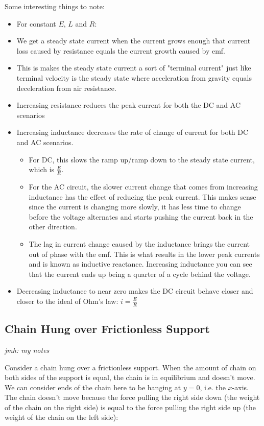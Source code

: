 \documentclass{article}
\begin{document}
Some interesting things to note:

\begin{itemize}
\item For constant $E$, $L$ and $R$:
\item We get a steady state current when the current grows enough that current loss caused by resistance equals the current growth caused by emf.
\item This is makes the steady state current a sort of "terminal current" just like terminal velocity is the steady state where acceleration from gravity equals deceleration from air resistance.
\item Increasing resistance reduces the peak current for both the DC and AC scenarios
\item Increasing inductance decreases the rate of change of current for both DC and AC scenarios.
\begin{itemize}
\item For DC, this slows the ramp up/ramp down to the steady state current, which is $\frac{E}{R}$.
\item For the AC circuit, the slower current change that comes from increasing inductance has the effect of reducing the peak current. This makes sense since the current is changing more slowly, it has less time to change before the voltage alternates and starts pushing the current back in the other direction.
\item The lag in current change caused by the inductance brings the current out of phase with the emf. This is what results in the lower peak currents and is known as inductive reactance. Increasing inductance you can see that the current ends up being a quarter of a cycle behind the voltage. 
\end{itemize}
\item Decreasing inductance to near zero makes the DC circuit behave closer and closer to the ideal of Ohm's law: $i = \frac{E}{R}$
\end{itemize}

\subsection{Chain Hung over Frictionless Support}

\emph{jmh: my notes}

Consider a chain hung over a frictionless support. When the amount of chain on both sides of the support is equal, the chain is in \@{equilibrium} and doesn't move. We can consider ends of the chain here to be hanging at $y = 0$, i.e. the $x$-axis. The chain doesn't move because the force pulling the right side down (the weight of the chain on the right side) is equal to the force pulling the right side up (the weight of the chain on the left side):
\end{document}
